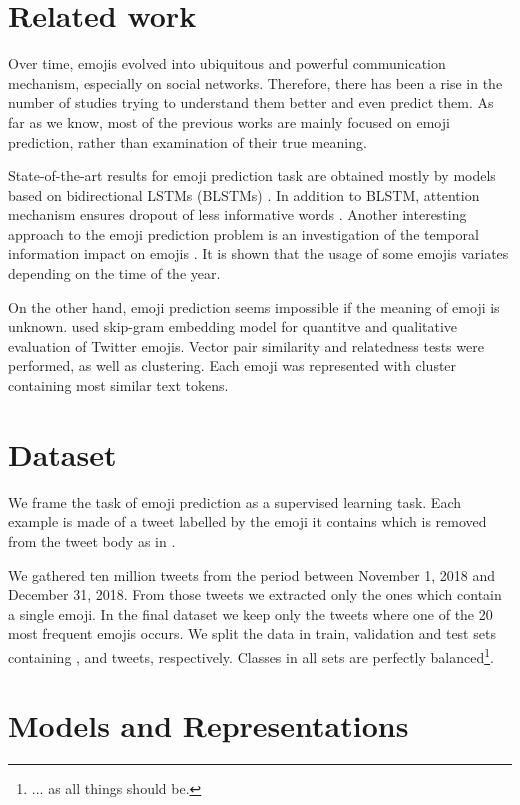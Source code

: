 \documentclass[10pt, a4paper]{article}
\begin{document}
\section{Related work}
Over time, emojis evolved into ubiquitous and powerful communication mechanism, especially on social networks. Therefore, there has been a rise in the number of studies trying to understand them better and even predict them. As far as we know, most of the previous works are mainly focused on emoji prediction, rather than examination of their true meaning. 

State-of-the-art results for emoji prediction task are obtained mostly by models based on bidirectional LSTMs (BLSTMs) \citep{barbieri2017}. In addition to BLSTM, attention mechanism ensures dropout of less informative words \citep{millions}. Another interesting approach to the emoji prediction problem is an investigation of the temporal information impact on emojis \citep{temporal}. It is shown that the usage of some emojis variates depending on the time of the year.

On the other hand, emoji prediction seems impossible if the meaning of emoji is unknown. \citep{mean} used skip-gram embedding model for quantitve and qualitative evaluation of Twitter emojis. Vector pair similarity and relatedness tests were performed, as well as clustering. Each emoji was represented with cluster containing most similar text tokens.

\section{Dataset}

We frame the task of emoji prediction as a supervised learning task. Each 
example is made of a tweet labelled by the emoji it contains which is removed 
from the tweet body as in \citep{barbieri2017emojis}. 

We gathered ten million tweets from the period between November 1, 2018 and 
December 31, 2018. From those tweets we extracted only the ones which contain a 
single emoji. In the final dataset we keep only the tweets where one of the 20 
most frequent emojis occurs. We split the data in train, validation and test 
sets containing ,  and  tweets,
respectively. Classes in all sets are perfectly balanced\footnote{... as all 
things should be.}.

\section{Models and Representations}
\label{sec:models}
\end{document}
